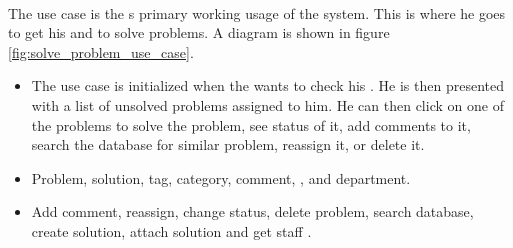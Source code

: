 \paragraph{\ucsolproblem[c]} The use case \ucsolproblem{} is the \astaff{}s primary working usage of the system. This is where he goes to get his \todolist{} and to solve problems. A diagram is shown in figure \ref{fig:solve_problem_use_case}.

\begin{itemize}
\item {} The use case is initialized when the \astaff[] wants to check his \todolist[]. He is then presented with a list of unsolved problems assigned to him. He can then click on one of the problems to solve the problem, see status of it, add comments to it, search the database for similar problem, reassign it, or delete it. 

\item {} Problem, solution, tag, category, comment, \client[], \staff[] and department. 

\item {} Add comment, reassign, change status, delete problem, search database, create solution, attach solution and get staff \todolist{}.
\end{itemize}

